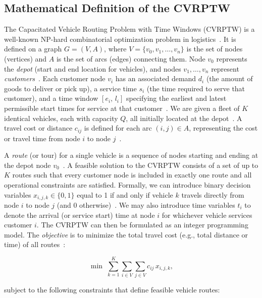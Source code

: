 \documentclass[conference]{IEEEtran}
\begin{document}
\subsection{Mathematical Definition of the CVRPTW}

The Capacitated Vehicle Routing Problem with Time Windows (CVRPTW) is a well-known NP-hard combinatorial optimization problem in logistics~\cite{holliday2025}. It is defined on a graph 
\(G = (V, A)\), where \(V = \{v_0, v_1, \ldots, v_n\}\) is the set of nodes (vertices) and \(A\) is the set of arcs (edges) connecting them. Node \(v_0\) represents the \emph{depot} (start and end location for vehicles), and nodes \(v_1, \dots, v_n\) represent \emph{customers}~\cite{borowski2020}. Each customer node \(v_i\) has an associated demand \(d_i\) (the amount of goods to deliver or pick up), a service time \(s_i\) (the time required to serve that customer), and a time window \([e_i,\, l_i]\) specifying the earliest and latest permissible start times for service at that customer~\cite{qi2011}. We are given a fleet of \(K\) identical vehicles, each with capacity \(Q\), all initially located at the depot~\cite{holliday2025}. A travel cost or distance \(c_{ij}\) is defined for each arc \((i,j) \in A\), representing the cost or travel time from node \(i\) to node \(j\)~\cite{borowski2020}. 

A \emph{route} (or tour) for a single vehicle is a sequence of nodes starting and ending at the depot node \(v_0\)~\cite{borowski2020}. A feasible solution to the CVRPTW consists of a set of up to \(K\) routes such that every customer node is included in exactly one route and all operational constraints are satisfied. Formally, we can introduce binary decision variables \(x_{i,j,k} \in \{0,1\}\) equal to 1 if and only if vehicle \(k\) travels directly from node \(i\) to node \(j\) (and 0 otherwise)~\cite{holliday2025}. We may also introduce time variables \(t_{i}\) to denote the arrival (or service start) time at node \(i\) for whichever vehicle services customer \(i\). The CVRPTW can then be formulated as an integer programming model.  \cite{article} The \emph{objective} is to minimize the total travel cost (e.g., total distance or time) of all routes~\cite{holliday2025}:

\[
 \min \; \sum_{k=1}^K \sum_{i \in V} \sum_{j \in V} c_{ij}\, x_{i,j,k},
\] 

subject to the following constraints that define feasible vehicle routes:
\end{document}
